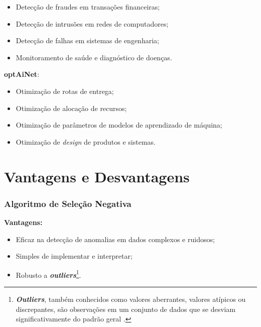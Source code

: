 \begin{itemize}
    \item Detecção de fraudes em transações financeiras;

    \item Detecção de intrusões em redes de computadores;

    \item Detecção de falhas em sistemas de engenharia;

    \item Monitoramento de saúde e diagnóstico de doenças.
\end{itemize}

\noindent \textbf{optAiNet}:

\begin{itemize}
    \item Otimização de rotas de entrega;

    \item Otimização de alocação de recursos;

    \item Otimização de parâmetros de modelos de aprendizado de máquina;

    \item Otimização de \textit{design} de produtos e sistemas.
\end{itemize}

\chapter{Vantagens e Desvantagens} \thispagestyle{mystyle}

\subsection{Algoritmo de Seleção Negativa}

\textbf{Vantagens:}

\begin{itemize}
    \item Eficaz na detecção de anomalias em dados complexos e ruidosos;
    
    \item Simples de implementar e interpretar;

    \item Robusto a \textbf{\textit{outliers}}\footnote{\textbf{\textit{Outliers}}, também conhecidos como valores aberrantes, valores atípicos ou discrepantes, são observações em um conjunto de dados que se desviam significativamente do padrão geral \cite{outliers2023}.}.
\end{itemize}

